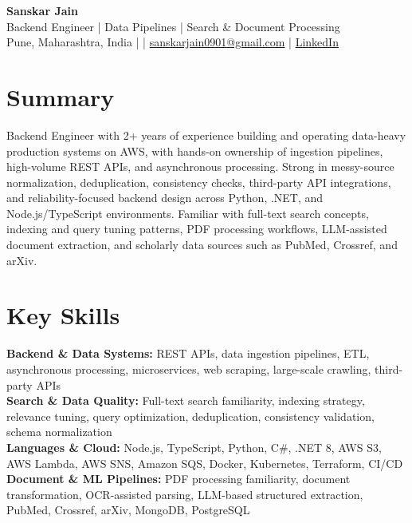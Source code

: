 \documentclass[10pt,letterpaper]{article}
\begin{document}
\begin{center}
    {\Large \textbf{Sanskar Jain}} \\
    Backend Engineer | Data Pipelines | Search \& Document Processing \\
    Pune, Maharashtra, India \enspace |  \enspace | \enspace
    \href{mailto:sanskarjain0901@gmail.com}{sanskarjain0901@gmail.com} \enspace | \enspace
    \href{https://www.linkedin.com/in/sanskar-jain0901/}{LinkedIn}
\end{center}

\section*{Summary}
Backend Engineer with 2+ years of experience building and operating data-heavy production systems on AWS, with hands-on ownership of ingestion pipelines, high-volume REST APIs, and asynchronous processing. Strong in messy-source normalization, deduplication, consistency checks, third-party API integrations, and reliability-focused backend design across Python, .NET, and Node.js/TypeScript environments. Familiar with full-text search concepts, indexing and query tuning patterns, PDF processing workflows, LLM-assisted document extraction, and scholarly data sources such as PubMed, Crossref, and arXiv.

\section*{Key Skills}
\textbf{Backend \& Data Systems:} REST APIs, data ingestion pipelines, ETL, asynchronous processing, microservices, web scraping, large-scale crawling, third-party APIs \\
\textbf{Search \& Data Quality:} Full-text search familiarity, indexing strategy, relevance tuning, query optimization, deduplication, consistency validation, schema normalization \\
\textbf{Languages \& Cloud:} Node.js, TypeScript, Python, C\#, .NET 8, AWS S3, AWS Lambda, AWS SNS, Amazon SQS, Docker, Kubernetes, Terraform, CI/CD \\
\textbf{Document \& ML Pipelines:} PDF processing familiarity, document transformation, OCR-assisted parsing, LLM-based structured extraction, PubMed, Crossref, arXiv, MongoDB, PostgreSQL
\end{document}
